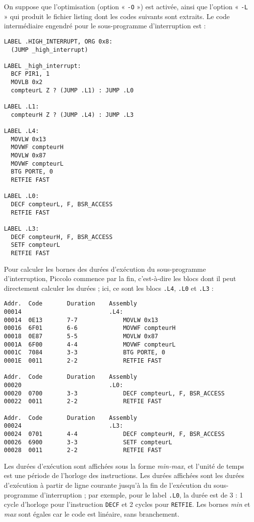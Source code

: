 On suppose que l'optimisation (option « \texttt{-O} ») est activée, ainsi que l'option « \texttt{-L} » qui produit le fichier listing dont les codes suivants sont extraits. Le code intermédiaire engendré pour le sous-programme d'interruption est : 

\begin{lstlisting}[language=assembleur]
LABEL .HIGH_INTERRUPT, ORG 0x8:
  (JUMP _high_interrupt)

LABEL _high_interrupt:
  BCF PIR1, 1
  MOVLB 0x2
  compteurL Z ? (JUMP .L1) : JUMP .L0

LABEL .L1:
  compteurH Z ? (JUMP .L4) : JUMP .L3

LABEL .L4:
  MOVLW 0x13
  MOVWF compteurH
  MOVLW 0x87
  MOVWF compteurL
  BTG PORTE, 0
  RETFIE FAST

LABEL .L0:
  DECF compteurL, F, BSR_ACCESS
  RETFIE FAST

LABEL .L3:
  DECF compteurH, F, BSR_ACCESS
  SETF compteurL
  RETFIE FAST
\end{lstlisting}

Pour calculer les bornes des durées d'exécution du sous-programme d'interruption, Piccolo commence par la fin, c'est-à-dire les blocs dont il peut directement calculer les durées ; ici, ce sont les blocs \texttt{.L4}, \texttt{.L0} et \texttt{.L3} :

\begin{lstlisting}[language=assembleur]
Addr.  Code       Duration    Assembly
00014                         .L4:
00014  0E13       7-7             MOVLW 0x13
00016  6F01       6-6             MOVWF compteurH
00018  0E87       5-5             MOVLW 0x87
0001A  6F00       4-4             MOVWF compteurL
0001C  7084       3-3             BTG PORTE, 0
0001E  0011       2-2             RETFIE FAST

Addr.  Code       Duration    Assembly
00020                         .L0:
00020  0700       3-3             DECF compteurL, F, BSR_ACCESS
00022  0011       2-2             RETFIE FAST

Addr.  Code       Duration    Assembly
00024                         .L3:
00024  0701       4-4             DECF compteurH, F, BSR_ACCESS
00026  6900       3-3             SETF compteurL
00028  0011       2-2             RETFIE FAST
\end{lstlisting}

Les durées d'exécution sont affichées sous la forme \emph{min-max}, et l'unité de temps est une période de l'horloge des instructions. Les durées affichées sont les durées d'exécution à partir de ligne courante jusqu'à la fin de l'exécution du sous-programme d'interruption ; par exemple, pour le label \texttt{.L0}, la durée est de $3$ : 1 cycle d'horloge pour l'instruction \texttt{DECF} et 2 cycles pour \texttt{RETFIE}. Les bornes \emph{min} et \emph{max} sont égales car le code est linéaire, sans branchement.

